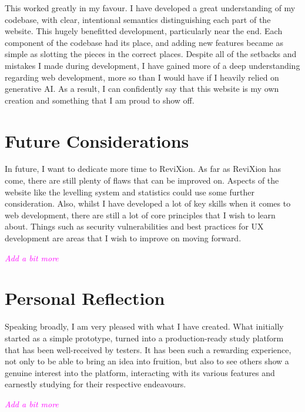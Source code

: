 \documentclass{report}
\begin{document}
This worked greatly in my favour.
I have developed a great understanding of my codebase, with clear, intentional semantics distinguishing each part of the website.
This hugely benefitted development, particularly near the end.
Each component of the codebase had its place,
and adding new features became as simple as slotting the pieces in the correct places.
Despite all of the setbacks and mistakes I made during development,
I have gained more of a deep understanding regarding web development, more so than I would have if I heavily relied on generative AI.
As a result, I can confidently say that this website is my own creation and something that I am proud to show off.

\section{Future Considerations}

In future, I want to dedicate more time to ReviXion.
As far as ReviXion has come, there are still plenty of flaws that can be improved on.
Aspects of the website like the levelling system and statistics could use some further consideration.
Also, whilst I have developed a lot of key skills when it comes to web development, there are still a lot of core principles that I wish to learn about.
Things such as security vulnerabilities and best practices for UX development are areas that I wish to improve on moving forward.

\textcolor{magenta}{\textit{Add a bit more}}

\section{Personal Reflection}

Speaking broadly, I am very pleased with what I have created.
What initially started as a simple prototype, turned into a production-ready study platform that has been well-received by testers.
It has been such a rewarding experience, not only to be able to bring an idea into fruition,
but also to see others show a genuine interest into the platform,
interacting with its various features and earnestly studying for their respective endeavours.

\textcolor{magenta}{\textit{Add a bit more}}



\nocite{*}
\end{document}
